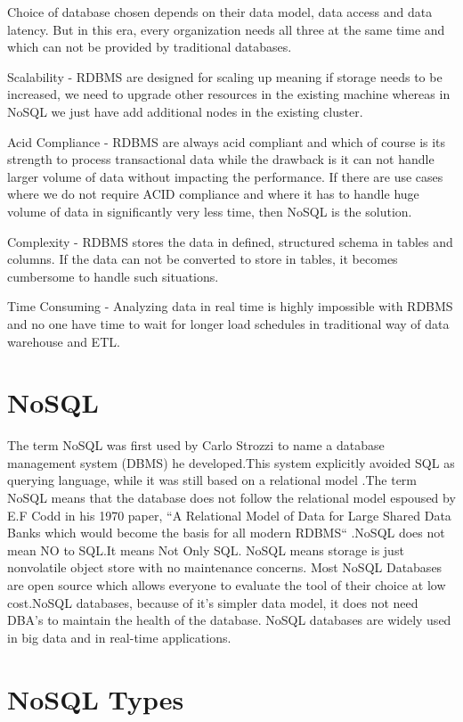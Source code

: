 \documentclass[sigconf]{acmart}
\begin{document}
Choice of database chosen depends on their data model, data access and data latency. But in this era, every organization needs all three at the same time and which can not be provided by traditional databases.

Scalability - RDBMS are designed for scaling up meaning if storage needs to be increased, we need to upgrade other resources in the existing machine whereas in NoSQL we just have add additional nodes in the existing cluster. 

Acid Compliance - RDBMS are always acid compliant and which of course is its strength to process transactional data while the drawback is it can not handle larger volume of data without impacting the performance. If there are use cases where we do not require ACID compliance and  where it has to handle huge volume of data in significantly very less time, then NoSQL is the solution.

Complexity - RDBMS stores the data in defined, structured schema in tables and columns. If the data can not be converted to store in tables, it becomes cumbersome to handle such situations. 

Time Consuming - Analyzing data in real time is highly impossible with RDBMS and no one have time to wait for longer load schedules in traditional way of data warehouse and ETL.

\section{NoSQL}

The term NoSQL was first used by Carlo Strozzi to name a database management system (DBMS) he developed.This system explicitly avoided SQL as querying language, while it was still based on a relational model \cite{seasupenn}.The term NoSQL means that the database does not follow the relational model espoused by E.F Codd in his 1970 paper, ``A Relational Model of Data for Large Shared Data Banks which would become the basis for all modern RDBMS`` \cite{rdbms}.NoSQL does not mean NO to SQL.It means Not Only SQL. NoSQL means storage is just nonvolatile object store with no maintenance concerns. Most NoSQL Databases are open source which allows everyone to evaluate the tool of their choice at low cost.NoSQL databases, because of it's simpler data model, it does not need DBA's to maintain the health of the database. NoSQL databases are widely used in big data and in real-time  applications.  

\section{NoSQL Types}
\end{document}
